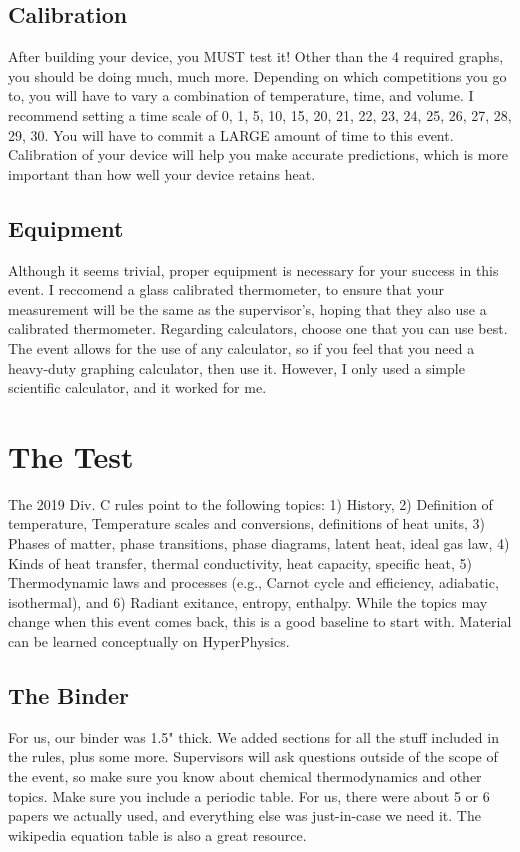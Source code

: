 \documentclass[twocolumn]{article}
\begin{document}
\subsection{Calibration}
After building your device, you MUST test it! Other than the 4 required graphs, you should be doing much, much more. Depending on which competitions you go to, you will have to vary a combination of temperature, time, and volume. I recommend setting a time scale of 0, 1, 5, 10, 15, 20, 21, 22, 23, 24, 25, 26, 27, 28, 29, 30. You will have to commit a LARGE amount of time to this event. Calibration of your device will help you make accurate predictions, which is more important than how well your device retains heat. 

\subsection{Equipment}
Although it seems trivial, proper equipment is necessary for your success in this event. I reccomend a glass calibrated thermometer, to ensure that your measurement will be the same as the supervisor's, hoping that they also use a calibrated thermometer. Regarding calculators, choose one that you can use best. The event allows for the use of any calculator, so if you feel that you need a heavy-duty graphing calculator, then use it. However, I only used a simple scientific calculator, and it worked for me. 

\section{The Test}
The 2019 Div. C rules point to the following topics: 1) History, 2) Definition of temperature, Temperature scales and conversions, definitions of heat units, 3) Phases of matter, phase transitions, phase diagrams, latent heat, ideal gas law, 4) Kinds of heat transfer, thermal conductivity, heat capacity, specific heat, 5) Thermodynamic laws and processes (e.g., Carnot cycle and efficiency, adiabatic, isothermal), and 6) Radiant exitance, entropy, enthalpy. While the topics may change when this event comes back, this is a good baseline to start with. \footnotemark Material can be learned conceptually on HyperPhysics. 

\subsection{The Binder}
For us, our binder was 1.5" thick. We added sections for all the stuff included in the rules, plus some more. Supervisors will ask questions outside of the scope of the event, so make sure you know about chemical thermodynamics and other topics. Make sure you include a periodic table. For us, there were about 5 or 6 papers we actually used, and everything else was just-in-case we need it. The wikipedia equation table is also a great resource. 
\end{document}
